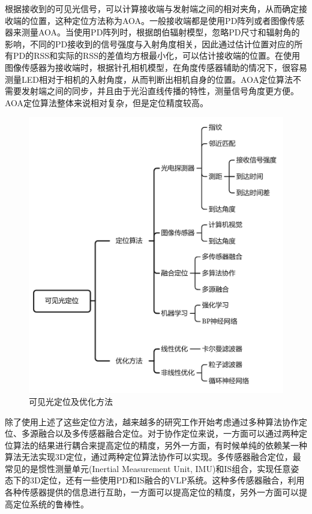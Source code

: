 根据接收到的可见光信号，可以计算接收端与发射端之间的相对夹角，从而确定接收端的位置，这种定位方法称为AOA。一般接收端都是使用PD阵列或者图像传感器来测量AOA。当使用PD阵列时，根据朗伯辐射模型，忽略PD尺寸和辐射角的影响，不同的PD接收到的信号强度与入射角度相关，因此通过估计位置对应的所有PD的RSS和实际的RSS的差值均方根最小化，可以估计接收端的位置\cite{vlp-pd-aoa}。在使用图像传感器为接收端时，根据针孔相机模型，在角度传感器辅助的情况下，很容易测量LED相对于相机的入射角度，从而判断出相机自身的位置\cite{vlp-is-aoa}。AOA定位算法不需要发射端之间的同步，并且由于光沿直线传播的特性，测量信号角度更方便。AOA定位算法整体来说相对复杂，但是定位精度较高。
\begin{figure}[!t]
  \centering
  \includegraphics[width=0.8\linewidth]{FIG/VLP methods.pdf}
  \caption{可见光定位及优化方法}
  \label{fig:vlp-methods}
\end{figure}

除了使用上述了这些定位方法，越来越多的研究工作开始考虑通过多种算法协作定位、多源融合以及多传感器融合定位\cite{zhuang2018survey}。对于协作定位来说，一方面可以通过两种定位算法的结果进行耦合来提高定位的精度，另外一方面，有时候单纯的依赖某一种算法无法实现3D定位，通过两种定位算法协作可以实现\cite{vlp-rss-aoa}。多传感器融合定位，最常见的是惯性测量单元(Inertial Measurement Unit, IMU)和IS组合，实现任意姿态下的3D定位，还有一些使用PD和IS融合的VLP系统。这种多传感器融合，利用各种传感器提供的信息进行互助，一方面可以提高定位的精度，另外一方面可以提高定位系统的鲁棒性\cite{vlp-fusionvlp,vlp-fusion-yang2022cga}。

